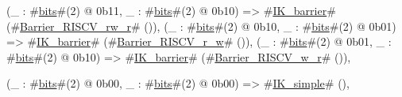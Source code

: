 {{{{		 (_ : #\hyperref[sailRISCVzbits]{bits}#(2) @ 0b11, _ : #\hyperref[sailRISCVzbits]{bits}#(2) @ 0b10) => #\hyperref[sailRISCVzIKzybarrier]{IK\_barrier}# (#\hyperref[sailRISCVzBarrierzyRISCVzyrwzyr]{Barrier\_RISCV\_rw\_r}# ()),
		 (_ : #\hyperref[sailRISCVzbits]{bits}#(2) @ 0b10, _ : #\hyperref[sailRISCVzbits]{bits}#(2) @ 0b01) => #\hyperref[sailRISCVzIKzybarrier]{IK\_barrier}# (#\hyperref[sailRISCVzBarrierzyRISCVzyrzyw]{Barrier\_RISCV\_r\_w}# ()),
		 (_ : #\hyperref[sailRISCVzbits]{bits}#(2) @ 0b01, _ : #\hyperref[sailRISCVzbits]{bits}#(2) @ 0b10) => #\hyperref[sailRISCVzIKzybarrier]{IK\_barrier}# (#\hyperref[sailRISCVzBarrierzyRISCVzywzyr]{Barrier\_RISCV\_w\_r}# ()),

                 (_ : #\hyperref[sailRISCVzbits]{bits}#(2) @ 0b00, _ : #\hyperref[sailRISCVzbits]{bits}#(2) @ 0b00) => #\hyperref[sailRISCVzIKzysimple]{IK\_simple}# (),

}}}}
